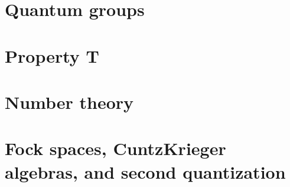 \section{Quantum groups}

\section{Property T}

\section{Number theory}

\section{Fock spaces, CuntzKrieger algebras, and second quantization}












